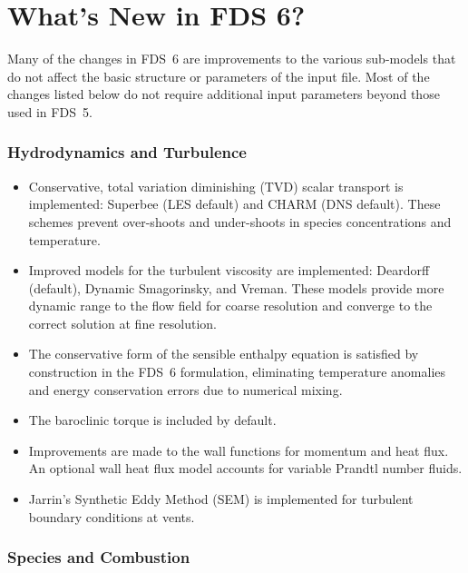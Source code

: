 \documentclass[11pt]{book}
\begin{document}
\section{What's New in FDS 6?}

Many of the changes in FDS~6 are improvements to the various sub-models that do not affect the basic structure or parameters of the input file. Most of the changes listed below do not require additional input parameters beyond those used in FDS~5.

\subsubsection{Hydrodynamics and Turbulence}

   \begin{itemize}
   \item Conservative, total variation diminishing (TVD) scalar transport is implemented: Superbee (LES default) and CHARM (DNS default). These schemes prevent over-shoots and under-shoots in species concentrations and temperature.
   \item Improved models for the turbulent viscosity are implemented: Deardorff (default), Dynamic Smagorinsky, and Vreman. These models provide more dynamic range to the flow field for coarse resolution and converge to the correct solution at fine resolution.
   \item The conservative form of the sensible enthalpy equation is satisfied by construction in the FDS~6 formulation, eliminating temperature anomalies and energy conservation errors due to numerical mixing.
   \item The baroclinic torque is included by default.
   \item Improvements are made to the wall functions for momentum and heat flux. An optional wall heat flux model accounts for variable Prandtl number fluids.
   \item Jarrin's Synthetic Eddy Method (SEM) is implemented for turbulent boundary conditions at vents.
   \end{itemize}

\subsubsection{Species and Combustion}
\end{document}
